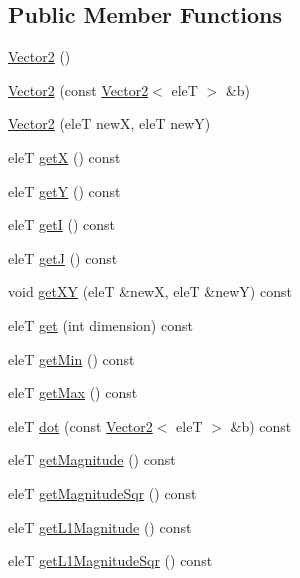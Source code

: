 \subsection*{Public Member Functions}
\begin{DoxyCompactItemize}
\item 
\hyperlink{classfc_1_1Vector2_ad30b8f86b3f06ad37bbdd969e0e95e51}{Vector2} ()
\item 
\hyperlink{classfc_1_1Vector2_a10c728791bce724586901ddb73038858}{Vector2} (const \hyperlink{classfc_1_1Vector2}{Vector2}$<$ eleT $>$ \&b)
\item 
\hyperlink{classfc_1_1Vector2_aa48168c3d2b43e6f129ec93edfa1cb24}{Vector2} (eleT newX, eleT newY)
\item 
eleT \hyperlink{classfc_1_1Vector2_aa38816eb2546c75ebfa2d28771095583}{getX} () const
\item 
eleT \hyperlink{classfc_1_1Vector2_a4f187c16fe4d3260ea890ff17f67d853}{getY} () const
\item 
eleT \hyperlink{classfc_1_1Vector2_a982222ce26bc27601de2ba42a3a48b80}{getI} () const
\item 
eleT \hyperlink{classfc_1_1Vector2_a0befaabdafcb34ab8c3bc0063d0b94a3}{getJ} () const
\item 
void \hyperlink{classfc_1_1Vector2_a4f9533a9e1a0dc8527f06e7531d238e5}{get\+XY} (eleT \&newX, eleT \&newY) const
\item 
eleT \hyperlink{classfc_1_1Vector2_acca96b9b6d26a214958f7e2d5fd63548}{get} (int dimension) const
\item 
eleT \hyperlink{classfc_1_1Vector2_a0b01872ead70d4faf63b1c80e9a1b77e}{get\+Min} () const
\item 
eleT \hyperlink{classfc_1_1Vector2_af599d74fd880011bc0b946b38453a9c4}{get\+Max} () const
\item 
eleT \hyperlink{classfc_1_1Vector2_a05169b39e6b1daa7a5a996fe8aec5f29}{dot} (const \hyperlink{classfc_1_1Vector2}{Vector2}$<$ eleT $>$ \&b) const
\item 
eleT \hyperlink{classfc_1_1Vector2_a9a093d6e5b12bd014a66a2202edaf84d}{get\+Magnitude} () const
\item 
eleT \hyperlink{classfc_1_1Vector2_a936d1ee4ee9945867b816f91d2a6f3f5}{get\+Magnitude\+Sqr} () const
\item 
eleT \hyperlink{classfc_1_1Vector2_ac00492b982cddd75f43a2f1a00f29dbe}{get\+L1\+Magnitude} () const
\item 
eleT \hyperlink{classfc_1_1Vector2_a6df1b13d81c9e0574beb9fdc90c23deb}{get\+L1\+Magnitude\+Sqr} () const
\item 

\end{DoxyCompactItemize}
